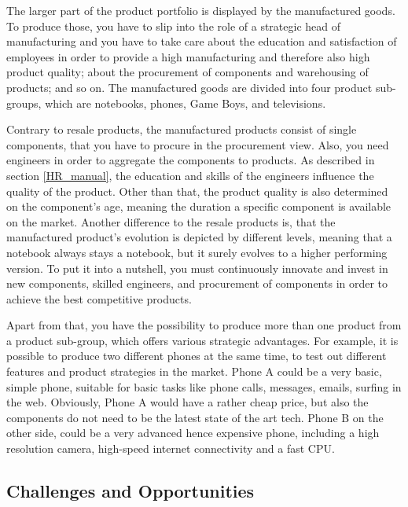 \documentclass[11pt,titlepage,oneside,openany]{book}
\begin{document}
The larger part of the product portfolio is displayed by the manufactured goods. To produce those, you have to slip into the role of a strategic head of manufacturing and you have to take care about the education and satisfaction of employees in order to provide a high manufacturing and therefore also high product quality; about the procurement of components and warehousing of products; and so on.
The manufactured goods are divided into four product sub-groups, which are notebooks, phones, Game Boys, and televisions. 

Contrary to resale products, the manufactured products consist of single components, that you have to procure in the procurement view. Also, you need engineers in order to aggregate the components to products. As described in section \ref{HR_manual}, the education and skills of the engineers influence the quality of the product. Other than that, the product quality is also determined on the component's age, meaning the duration a specific component is available on the market. Another difference to the resale products is, that the manufactured product's evolution is depicted by different levels, meaning that a notebook always stays a notebook, but it surely evolves to a higher performing version. To put it into a nutshell, you must continuously innovate and invest in new components, skilled engineers, and procurement of components in order to achieve the best competitive products. 

Apart from that, you have the possibility to produce more than one product from a product sub-group, which offers various strategic advantages. For example, it is possible to produce two different phones at the same time, to test out different features and product strategies in the market. Phone A could be a very basic, simple phone, suitable for basic tasks like phone calls, messages, emails, surfing in the web. Obviously, Phone A would have a rather cheap price, but also the components do not need to be the latest state of the art tech. Phone B on the other side, could be a very advanced hence expensive phone, including a high resolution camera, high-speed internet connectivity and a fast CPU.

\subsection{Challenges and Opportunities}
\end{document}
